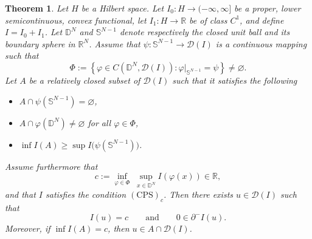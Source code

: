 \documentclass[11pt]{article}
\newtheorem{theorem}{Theorem}[section] %
\begin{document}
\begin{theorem}\label{thm:Linking_theorem}
Let $H$ be a Hilbert space. Let
$I_0 : H \to (-\infty, \infty]$ be a proper, lower semicontinuous, convex
functional, let
$I_1 : H \to \mathbb{R}$ be of class $C^1$, and define
$I = I_0 + I_1$.
Let $\mathbb{D}^N$ and $\mathbb{S}^{N-1}$ denote respectively the closed unit ball and its boundary sphere in $\mathbb{R}^N$. Assume that $\psi : \mathbb{S}^{N-1} \to \mathcal{D}(I)$ is a continuous mapping such that
\begin{equation*}
\Phi :=
\left\{
\varphi \in C(\mathbb{D}^N, \mathcal{D}(I)) :
\varphi|_{\mathbb{S}^{N-1}} = \psi
\right\}
\neq \varnothing .
\end{equation*}
Let $A$ be a relatively closed subset of $\mathcal{D}(I)$ such that it satisfies the following
\begin{itemize}
    \item $A \cap \psi(\mathbb{S}^{N-1}) = \varnothing$,
    \item $A \cap \varphi(\mathbb{D}^N) \neq \varnothing$ for all $\varphi \in \Phi$,
    \item $\inf I(A) \ge \sup I\bigl( \psi(\mathbb{S}^{N-1}) \bigr)$.
\end{itemize}
Assume furthermore that
\begin{equation*}
c :=
\inf_{\varphi \in \Phi}
\;
\sup_{x \in \mathbb{D}^N}
I(\varphi(x))
\in \mathbb{R},
\end{equation*}
and that $I$ satisfies the condition $(\mathrm{CPS})_c$.
Then there exists $u \in \mathcal{D}(I)$ such that
\begin{equation*}
I(u) = c
\qquad \text{and} \qquad
0 \in \partial^- I(u).
\end{equation*}
Moreover, if $\inf I(A) = c$, then $u \in A \cap \mathcal{D}(I)$.
\end{theorem}


\end{document}
